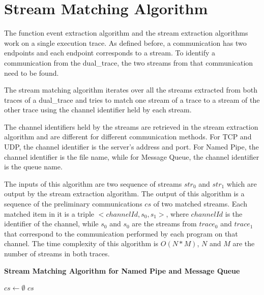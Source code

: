 \section{Stream Matching Algorithm}\label{streammatch}
The function event extraction algorithm and the stream extraction algorithms work on a single execution trace. As defined before, a communication has two endpoints and each endpoint corresponds to a stream. To identify a communication from the dual\_trace, the two streams from that communication need to be found. 

The stream matching algorithm iterates over all the streams extracted from both traces of a dual\_trace and tries to match one stream of a trace to a stream of the other trace using the channel identifier held by each stream.

The channel identifiers held by the streams are retrieved in the stream extraction algorithm and are different for different communication methods. For TCP and UDP, the channel identifier is the server's address and port. For Named Pipe, the channel identifier is the file name, while for Message Queue, the channel identifier is the queue name.  

 The inputs of this algorithm are two sequence of streams $str_0$ and $str_1$ which are output by the stream extraction algorithm. The output of this algorithm is a sequence of the preliminary communications $cs$ of two matched streams. Each matched item in it is a triple $<channelId, s_0, s_1>$, where $channelId$ is the identifier of the channel, while $s_0$ and $s_0$ are the streams from $trace_0$ and $trace_1$ that correspond to the communication performed by each program on that channel. The time complexity of this algorithm is $O(N*M)$, $N$ and $M$ are the number of streams in both traces.
 
 \begin{algorithm}[H]
\DontPrintSemicolon
\caption{{\bf Stream Matching Algorithm for Named Pipe and Message Queue} \label{matchAlg}}
$cs \leftarrow \emptyset$\; 
\KwRet $cs$\;
\end{algorithm} 

